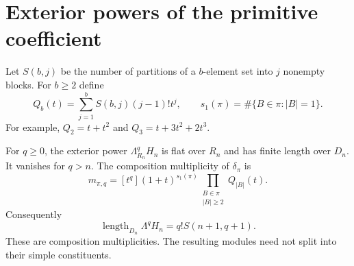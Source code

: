 \section{Exterior powers of the primitive coefficient}
\label{cbc:ct:exterior}

Let $S(b,j)$ be the number of partitions of a $b$-element set
into $j$ nonempty blocks. For $b\geq2$ define
\[
 Q_b(t)=\sum_{j=1}^b S(b,j)(j-1)!t^j,
 \qquad s_1(\pi)=\#\{B\in\pi:|B|=1\}.
\]
For example, $Q_2=t+t^2$ and $Q_3=t+3t^2+2t^3$.

\begin{theorem}\label{cbc:ct:multiplicities}
For $q\geq0$, the exterior power $\Lambda^q_{R_n}H_n$ is flat over $R_n$
and has finite length over $D_n$. It vanishes for $q>n$.
The composition multiplicity of $\delta_\pi$ is
\begin{equation}\label{cbc:ct:multiplicity}
 m_{\pi,q}=[t^q](1+t)^{s_1(\pi)}
                 \prod_{\substack{B\in\pi\\|B|\geq2}}
                      Q_{|B|}(t).
\end{equation}
Consequently
\begin{equation}\label{cbc:ct:length}
 \operatorname{length}_{D_n}\Lambda^qH_n=q!S(n+1,q+1).
\end{equation}
These are composition multiplicities. The resulting modules
need not split into their simple constituents.
\end{theorem}

